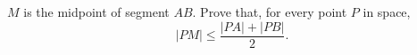 $M$ is the midpoint of segment $AB$. Prove that, for every point $P$ in space,
\[ |PM| \leq \frac{|PA| + |PB|}{2}. \]
